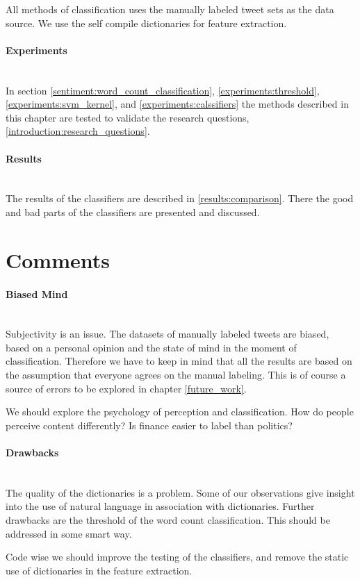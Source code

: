 All methods of classification uses the manually labeled tweet sets as the data
source. We use the self compile dictionaries for feature extraction.

\paragraph{Experiments}
\hspace{0pt}\\
In section \ref{sentiment:word_count_classification},
\ref{experiments:threshold}, \ref{experiments:svm_kernel}, and
\ref{experiments:calssifiers} the methods described in this chapter are tested
to validate the research questions, \ref{introduction:research_questions}.

\paragraph{Results}
\hspace{0pt}\\
The results of the classifiers are described in \ref{results:comparison}. There
the good and bad parts of the classifiers are presented and discussed. 
%

\section{Comments}\label{sentiment:comments_discussion}

\paragraph{Biased Mind}
\hspace{0pt}\\
Subjectivity is an issue. The datasets of manually labeled tweets are biased,
based on a personal opinion and the state of mind in the moment of
classification. Therefore we have to keep in mind that all the results are based
on the assumption that everyone agrees on the manual labeling. This is of course
a source of errors to be explored in chapter \ref{future_work}. 

We should explore the psychology of perception and classification. How do
people perceive content differently? Is finance easier to label than politics?

\paragraph{Drawbacks}
\hspace{0pt}\\
The quality of the dictionaries is a problem. Some of our observations give
insight into the use of natural language in association with dictionaries. 
Further drawbacks are the threshold of the word count classification. This
should be addressed in some smart way. 

Code wise we should improve the testing of the classifiers, and remove the
static use of dictionaries in the feature extraction.  
%
